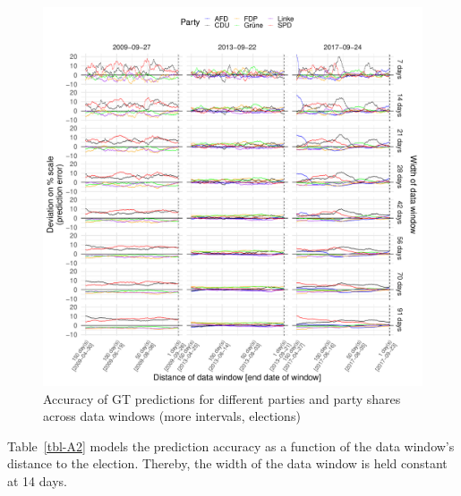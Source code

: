 \documentclass[
  letterpaper,
  DIV=11,
  numbers=noendperiod]{scrartcl}
\begin{document}
\begin{figure}[H]

\caption{\label{fig-A5}Accuracy of GT predictions for different parties
and party shares across data windows (more intervals, elections)}

{\centering \includegraphics{figures/fig-A5-1.pdf}

}

\end{figure}

Table~\ref{tbl-A2} models the prediction accuracy as a function of the
data window's distance to the election. Thereby, the width of the data
window is held constant at 14 days.
\end{document}
